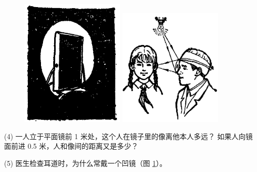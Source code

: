 \begin{figure}[htbp]
    \centering
    \begin{minipage}{7cm}
    \centering
    \includegraphics[width=5cm]{../pic/czwl2-ch1-16}
    \caption{}\label{fig:1-16}
    \end{minipage}
    \qquad
    \begin{minipage}{7cm}
    \centering
    \includegraphics[width=5cm]{../pic/czwl2-ch1-17}
    \caption{}\label{fig:1-17}
    \end{minipage}
\end{figure}

(4) 一人立于平面镜前 1 米处，这个人在镜子里的像离他本人多远？
如果人向镜面前进 0.5 米，人和像间的距离又是多少？

(5) 医生检查耳道时，为什么常戴一个凹镜（图 \ref{fig:1-17}）。


